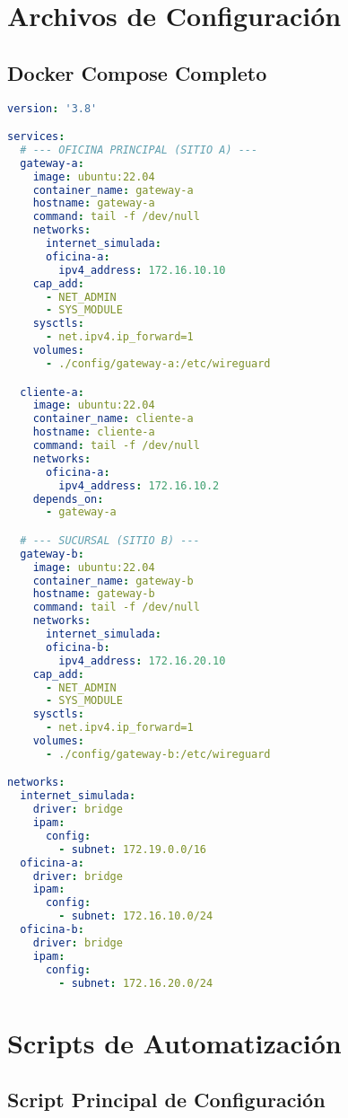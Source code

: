 \appendix

\section{Archivos de Configuración}

\subsection{Docker Compose Completo}

\begin{lstlisting}[language=yaml, caption=docker-compose.yml]
version: '3.8'

services:
  # --- OFICINA PRINCIPAL (SITIO A) ---
  gateway-a:
    image: ubuntu:22.04
    container_name: gateway-a
    hostname: gateway-a
    command: tail -f /dev/null
    networks:
      internet_simulada:
      oficina-a:
        ipv4_address: 172.16.10.10
    cap_add:
      - NET_ADMIN
      - SYS_MODULE
    sysctls:
      - net.ipv4.ip_forward=1
    volumes:
      - ./config/gateway-a:/etc/wireguard

  cliente-a:
    image: ubuntu:22.04
    container_name: cliente-a
    hostname: cliente-a
    command: tail -f /dev/null
    networks:
      oficina-a:
        ipv4_address: 172.16.10.2
    depends_on:
      - gateway-a

  # --- SUCURSAL (SITIO B) ---
  gateway-b:
    image: ubuntu:22.04
    container_name: gateway-b
    hostname: gateway-b
    command: tail -f /dev/null
    networks:
      internet_simulada:
      oficina-b:
        ipv4_address: 172.16.20.10
    cap_add:
      - NET_ADMIN
      - SYS_MODULE
    sysctls:
      - net.ipv4.ip_forward=1
    volumes:
      - ./config/gateway-b:/etc/wireguard

networks:
  internet_simulada:
    driver: bridge
    ipam:
      config:
        - subnet: 172.19.0.0/16
  oficina-a:
    driver: bridge
    ipam:
      config:
        - subnet: 172.16.10.0/24
  oficina-b:
    driver: bridge
    ipam:
      config:
        - subnet: 172.16.20.0/24
\end{lstlisting}

\section{Scripts de Automatización}

\subsection{Script Principal de Configuración}


